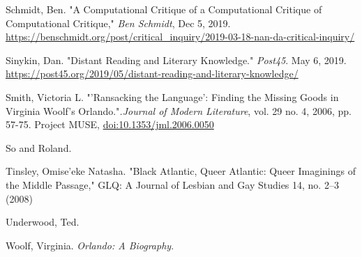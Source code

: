 \documentclass[11pt]{article}
\begin{document}
Schmidt, Ben. "A Computational Critique of a Computational Critique of
Computational Critique," \emph{Ben Schmidt}, Dec
5, 2019. \url{https://benschmidt.org/post/critical\_inquiry/2019-03-18-nan-da-critical-inquiry/}

Sinykin, Dan. "Distant Reading and Literary Knowledge."  \emph{Post45}. May
6, 2019. \url{https://post45.org/2019/05/distant-reading-and-literary-knowledge/}

Smith, Victoria L.  "'Ransacking the Language': Finding the Missing
Goods in Virginia Woolf's Orlando."\emph{.Journal of Modern Literature},
vol. 29 no. 4, 2006, pp. 57-75. Project MUSE,
\url{doi:10.1353/jml.2006.0050}

So and Roland.

Tinsley, Omise'eke Natasha. "Black Atlantic, Queer Atlantic: Queer
Imaginings of the Middle Passage," GLQ: A Journal of Lesbian and Gay
Studies 14, no. 2–3 (2008)

Underwood, Ted. 

Woolf, Virginia. \emph{Orlando: A Biography}.
\end{document}
